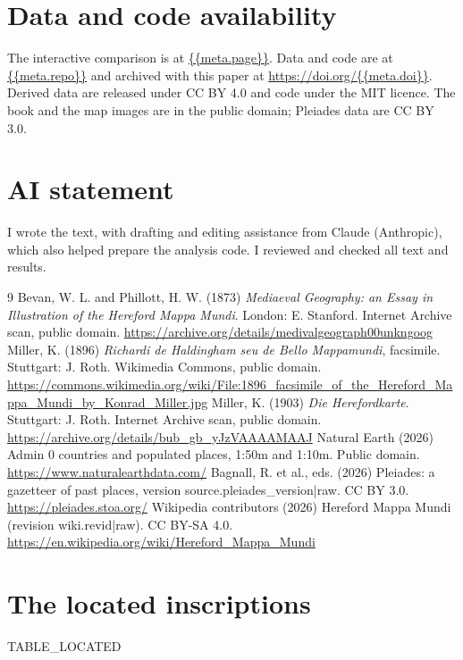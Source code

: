 \documentclass[11pt,a4paper]{article}
\begin{document}
\section*{Data and code availability}
The interactive comparison is at \url{{{meta.page}}}. Data and code are at \url{{{meta.repo}}} and archived with this paper at \url{https://doi.org/{{meta.doi}}}. Derived data are released under CC BY 4.0 and code under the MIT licence. The book and the map images are in the public domain; Pleiades data are CC BY 3.0.

\section*{AI statement}
I wrote the text, with drafting and editing assistance from Claude (Anthropic), which also helped prepare the analysis code. I reviewed and checked all text and results.

\begin{thebibliography}{9}
 Bevan, W. L. and Phillott, H. W. (1873) \textit{Mediaeval Geography: an Essay in Illustration of the Hereford Mappa Mundi}. London: E. Stanford. Internet Archive scan, public domain. \url{https://archive.org/details/medivalgeograph00unkngoog}
 Miller, K. (1896) \textit{Richardi de Haldingham seu de Bello Mappamundi}, facsimile. Stuttgart: J. Roth. Wikimedia Commons, public domain. \url{https://commons.wikimedia.org/wiki/File:1896_facsimile_of_the_Hereford_Mappa_Mundi_by_Konrad_Miller.jpg}
 Miller, K. (1903) \textit{Die Herefordkarte}. Stuttgart: J. Roth. Internet Archive scan, public domain. \url{https://archive.org/details/bub_gb_yJzVAAAAMAAJ}
 Natural Earth (2026) Admin 0 countries and populated places, 1:50m and 1:10m. Public domain. \url{https://www.naturalearthdata.com/}
 Bagnall, R. et al., eds. (2026) Pleiades: a gazetteer of past places, version {{source.pleiades_version|raw}}. CC BY 3.0. \url{https://pleiades.stoa.org/}
 Wikipedia contributors (2026) Hereford Mappa Mundi (revision {{wiki.revid|raw}}). CC BY-SA 4.0. \url{https://en.wikipedia.org/wiki/Hereford_Mappa_Mundi}
\end{thebibliography}

\clearpage
\appendix
\section{The located inscriptions}
{{TABLE_LOCATED}}
\end{document}
